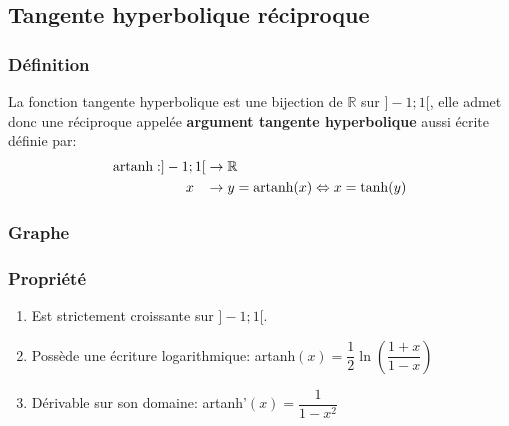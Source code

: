 \documentclass[12pt,a4paper]{report}
\begin{document}
	\subsection*{Tangente hyperbolique réciproque}
	\subsubsection*{Définition}
	La fonction tangente hyperbolique est une bijection de $\mathbb{R}$ sur $]-1;1[$, elle admet donc une réciproque appelée \textbf{argument tangente hyperbolique} aussi écrite  définie par:
	\begin{align*}
	\text{artanh}: ]-1;1[ &\rightarrow \mathbb{R} \\
	x \hspace{0.3cm} &\rightarrow y =\text{artanh}(x) \Leftrightarrow x=\tanh(y)
	\end{align*}
	\subsubsection*{Graphe}
	\subsubsection*{Propriété}
	\begin{enumerate}
		\item Est strictement croissante sur $]-1;1[$.
		\item Possède une écriture logarithmique: artanh$(x) = \dfrac{1}{2}\ln\left(\dfrac{1+x}{1-x}\right)$
		\item Dérivable sur son domaine: artanh'$(x)=\dfrac{1}{1-x^2}$
	\end{enumerate}
\end{document}
